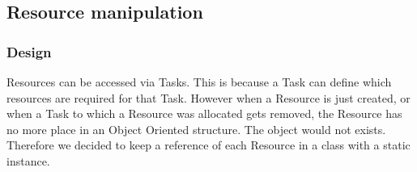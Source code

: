 \documentclass[a4paper,11pt]{article}
\begin{document}
		\subsection{Resource manipulation}
			\subsubsection{Design}
			Resources can be accessed via Tasks. This is because a Task can define which resources are required for that Task.
			However when a Resource is just created, or when a Task to which a Resource was allocated gets removed, the Resource has no more place in an Object Oriented structure. The object would not exists.
			Therefore we decided to keep a reference of each Resource in a class with a static instance.
\end{document}
